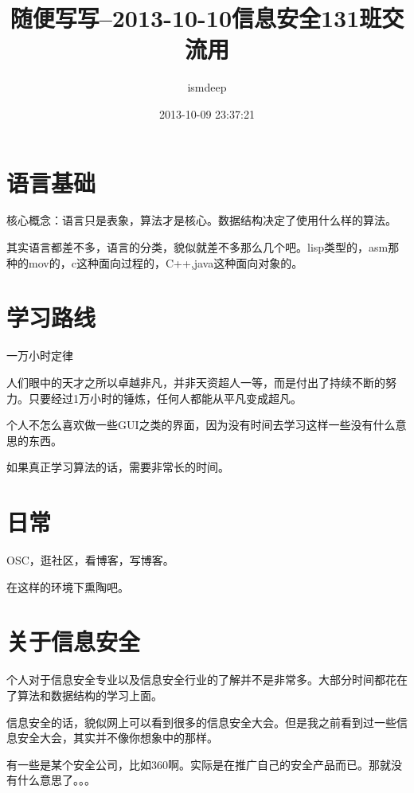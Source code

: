 \documentclass[12pt,a4paper]{article}
\begin{document}
\begin{CJK}{UTF8}{gbsn}
\title{随便写写--2013-10-10信息安全131班交流用}
\author{ismdeep}
\date{2013-10-09 23:37:21}


\maketitle



\section{语言基础}
核心概念：语言只是表象，算法才是核心。数据结构决定了使用什么样的算法。

其实语言都差不多，语言的分类，貌似就差不多那么几个吧。lisp类型的，asm那种的mov的，c这种面向过程的，C++,java这种面向对象的。


\section{学习路线}
一万小时定律

人们眼中的天才之所以卓越非凡，并非天资超人一等，而是付出了持续不断的努力。只要经过1万小时的锤炼，任何人都能从平凡变成超凡。

个人不怎么喜欢做一些GUI之类的界面，因为没有时间去学习这样一些没有什么意思的东西。

如果真正学习算法的话，需要非常长的时间。

\section{日常}
OSC，逛社区，看博客，写博客。

在这样的环境下熏陶吧。

\section{关于信息安全}
个人对于信息安全专业以及信息安全行业的了解并不是非常多。大部分时间都花在了算法和数据结构的学习上面。

信息安全的话，貌似网上可以看到很多的信息安全大会。但是我之前看到过一些信息安全大会，其实并不像你想象中的那样。

有一些是某个安全公司，比如360啊。实际是在推广自己的安全产品而已。那就没有什么意思了。。。


\end{CJK}
\end{document}
